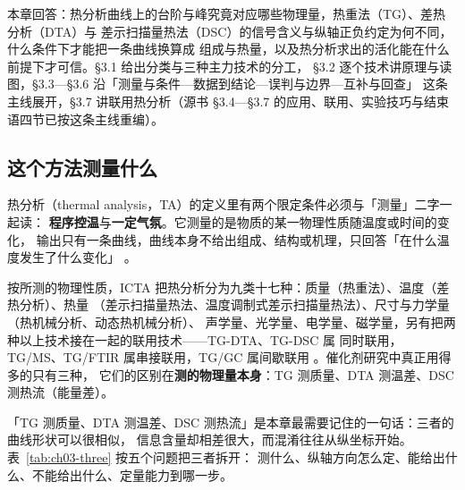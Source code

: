 
%
{本章回答：热分析曲线上的台阶与峰究竟对应哪些物理量，热重法（TG）、差热分析（DTA）与
差示扫描量热法（DSC）的信号含义与纵轴正负约定为何不同，什么条件下才能把一条曲线换算成
组成与热量，以及热分析求出的活化能在什么前提下才可信。§3.1 给出分类与三种主力技术的分工，
§3.2 逐个技术讲原理与读图，§3.3—§3.6 沿「测量与条件—数据到结论—误判与边界—互补与回查」
这条主线展开，§3.7 讲联用热分析（源书 §3.4—§3.7 的应用、联用、实验技巧与结束语四节已按这条主线重编）。}
\label{ch:03}

\subsection{这个方法测量什么}

\begin{probout}
热分析（thermal analysis，TA）的定义里有两个限定条件必须与「测量」二字一起读：
\textbf{程序控温}与\textbf{一定气氛}。它测量的是物质的某一物理性质随温度或时间的变化，
输出只有一条曲线，曲线本身不给出组成、结构或机理，只回答「在什么温度发生了什么变化」
。

按所测的物理性质，ICTA 把热分析分为九类十七种：质量（热重法）、温度（差热分析）、热量
（差示扫描量热法、温度调制式差示扫描量热法）、尺寸与力学量（热机械分析、动态热机械分析）、
声学量、光学量、电学量、磁学量，另有把两种以上技术接在一起的联用技术——TG-DTA、TG-DSC 属
同时联用，TG/MS、TG/FTIR 属串接联用，TG/GC 属间歇联用
。催化剂研究中真正用得多的只有三种，
它们的区别在\textbf{测的物理量本身}：TG 测质量、DTA 测温差、DSC 测热流（能量差）。
\end{probout}

「TG 测质量、DTA 测温差、DSC 测热流」是本章最需要记住的一句话：三者的曲线形状可以很相似，
信息含量却相差很大，而混淆往往从纵坐标开始。表~\ref{tab:ch03-three} 按五个问题把三者拆开：
测什么、纵轴方向怎么定、能给出什么、不能给出什么、定量能力到哪一步。

